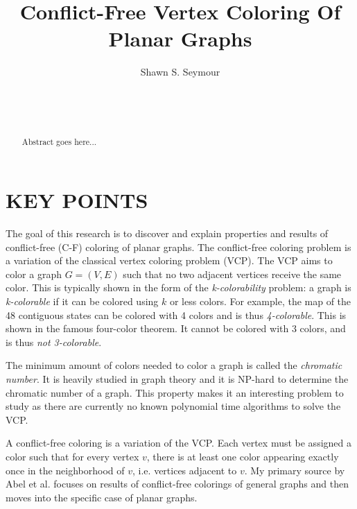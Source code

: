 \documentclass{sig-alternate}
\begin{document}

\title{Conflict-Free Vertex Coloring Of Planar Graphs}


\author{
\alignauthor
Shawn S. Seymour\\
	\\
	\\
	\\
}

\maketitle
\begin{abstract}
Abstract goes here...
\end{abstract}

\section*{KEY POINTS}
The goal of this research is to discover and explain properties and results of conflict-free (C-F) coloring of planar graphs. The conflict-free coloring problem is a variation of the classical vertex coloring problem (VCP). The VCP aims to color a graph \(G = (V, E)\) such that no two adjacent vertices receive the same color. This is typically shown in the form of the \emph{k-colorability} problem: a graph is \emph{k-colorable} if it can be colored using $k$ or less colors. For example, the map of the 48 contiguous states can be colored with 4 colors and is thus \emph{4-colorable}. This is shown in the famous four-color theorem. It cannot be colored with 3 colors, and is thus \emph{not 3-colorable}.

The minimum amount of colors needed to color a graph is called the \emph{chromatic number}. It is heavily studied in graph theory and it is NP-hard to determine the chromatic number of a graph. This property makes it an interesting problem to study as there are currently no known polynomial time algorithms to solve the VCP.

A conflict-free coloring is a variation of the VCP. Each vertex must be assigned a color such that for every vertex $v$, there is at least one color appearing exactly once in the neighborhood of $v$, i.e. vertices adjacent to $v$. My primary source by Abel et al. \cite{abel2017three} focuses on results of conflict-free colorings of general graphs and then moves into the specific case of planar graphs.
\end{document}
